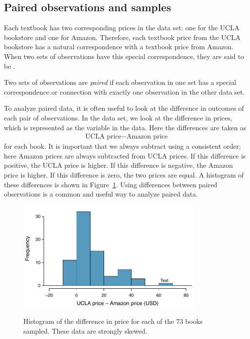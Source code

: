 \subsection{Paired observations and samples}

Each textbook has two corresponding prices in the data set: one for the UCLA bookstore and one for Amazon. Therefore, each textbook price from the UCLA bookstore has a natural correspondence with a textbook price from Amazon. When two sets of observations have this special correspondence, they are said to be .

\begin{termBox}{
Two sets of observations are \emph{paired} if each observation in one set has a special correspondence or connection with exactly one observation in the other data set.}
\end{termBox}

To analyze paired data, it is often useful to look at the difference in outcomes of each pair of observations. In the  data set, we look at the difference in prices, which is represented as the  variable in the  data. Here the differences are taken as
\begin{eqnarray*}
\text{UCLA price} - \text{Amazon price}
\end{eqnarray*}
for each book. It is important that we always subtract using a consistent order; here Amazon prices are always subtracted from UCLA prices. If this difference is positive, the UCLA price is higher. If this difference is negative, the Amazon price is higher. If this difference is zero, the two prices are equal. A histogram of these differences is shown in Figure~\ref{diffInTextbookPricesS10}. Using differences between paired observations is a common and useful way to analyze paired data.

\begin{figure}
\centering
 \href{\oiRedirectUrl{tableau_hist_textbook_price_diff}}{\includegraphics[width=0.83\textwidth]{ch_inference_for_means/figures/textbooksS10/diffInTextbookPricesS10}}
\caption{Histogram of the difference in price for each of the 73 books sampled. These data are strongly skewed.}
\label{diffInTextbookPricesS10}
\end{figure}

